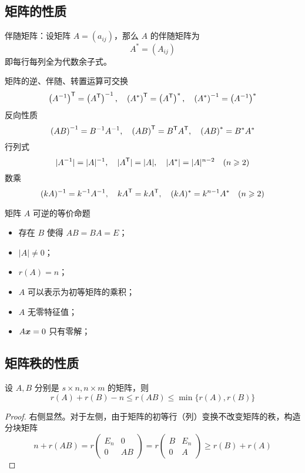 \subsection{矩阵的性质}

伴随矩阵：设矩阵 $A = (a_{ij})$，那么 $A$ 的伴随矩阵为
\[ A^*=(A_{ij}) \]
即每行每列全为代数余子式。

矩阵的逆、伴随、转置运算可交换
\[ {\left(A^{-1}\right)}^\mathsf{T} = \left({A}^\mathsf{T}\right)^{-1}, \quad {\left(A^{*}\right)}^\mathsf{T} = \left({A}^\mathsf{T}\right)^{*}, \quad \left(A^{*}\right)^{-1} = \left(A^{-1}\right)^{*} \]
反向性质
\[ \left(AB\right)^{-1} = B^{-1}A^{-1}, \quad {\left(AB\right)}^\mathsf{T} = {B}^\mathsf{T} {A}^\mathsf{T}, \quad \left(AB\right)^{*} = B^{*}A^{*} \]
行列式
\[ |A^{-1}| = |A|^{-1}, \quad |{A}^\mathsf{T}| = |A|, \quad |A^{*}| = |A|^{n-2} \quad (n \geqslant 2) \]
数乘
\[ (kA)^{-1} = k^{-1} A^{-1}, \quad {kA}^\mathsf{T} = k{A}^\mathsf{T}, \quad (kA)^{*} = k^{n-1} A^{*} \quad (n \geqslant 2) \]

矩阵 $A$ 可逆的等价命题
\begin{itemize}
	\item 存在 $B$ 使得 $AB = BA = E$；
	\item $|A| \neq 0$；
	\item $r(A) = n$；
	\item $A$ 可以表示为初等矩阵的乘积；
	\item $A$ 无零特征值；
	\item $A\boldsymbol{x} = 0$ 只有零解；
\end{itemize}

\subsection{矩阵秩的性质}

\begin{theorem}
	设 $A, B$ 分别是 $s \times n, n \times m$ 的矩阵，则
	\[ r(A) + r(B) - n \leqslant r(AB) \leqslant \min\{r(A),r(B)\} \]
\end{theorem}

\begin{proof}
	右侧显然。对于左侧，由于矩阵的初等行（列）变换不改变矩阵的秩，构造分块矩阵
	\[ n + r(AB) = r \left(\begin{matrix}
				E_n & 0 \\ 0 & AB
			\end{matrix}\right) = r\left(\begin{matrix}
				B & E_n \\ 0 & A
			\end{matrix}\right) \geqslant r(B) + r(A) \]
\end{proof}

